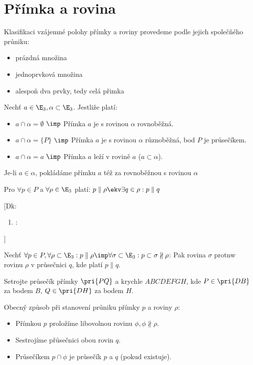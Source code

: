 
\let\braceru=\relax \let\bracelu=\relax 
\def\o#1{\setbox0=
	\hbox{$\kern2pt\overbrace{\kern-2pt#1\kern-2pt}\kern2pt$}\ht0=2.1ex\box0}
\def\to#1{\hbox{#1\rlap{\t{}}}}
\def\rad{\rm{rad}}
\def\f{\frac}
\section{Přímka a rovina}
\Poz Klasifikaci vzájemné polohy přímky a roviny provedeme podle jejich společňého průniku:
\begin{itemize}[a)]
	\item prázdná množina
	\item jednoprvková množina
	\item alespoň dva prvky, tedy celá přimka
\end{itemize}
\Def
Nechť $a\in\E_3,\alpha\subset \E_3$. Jestliže platí:
\begin{itemize}[a)]
	\item $a\cap \alpha = \emptyset$ $\imp$ Přímka $a$ je s rovinou $\alpha$ rovnoběžná.
	\item $a\cap \alpha = \{P\}$ $\imp$ Přímka $a$ je s rovinou $\alpha$ různoběžná, bod $P$ je průsečíkem.
	\item $a\cap \alpha = a$ $\imp$ Přímka $a$ leží v rovině $a$ ($a\subset\alpha$).
\end{itemize}

\Poz Je-li $a\in \alpha$, pokládáme přímku $a$ též za rovnoběžnou s rovinou $\alpha$

Pro $\forall p \in P$ a $\forall \rho \in \E_3$ platí: $p\parallel\rho \ekv \exists q \in \rho: p \parallel q$

[Dk: 
\begin{enumerate}[1.]
	\item \uv{$\imp$}: 
\end{enumerate}
]

\V  Nechť $\forall p \in P, \forall \rho \subset \E_3 : p \parallel \rho \imp \forall \sigma \subset \E_3 : p \subset \sigma \nparallel \rho$: Pak rovina $\sigma$ protnw rovinu $\rho $ v průsečnici $q$, kde platí $p\parallel q$.

\Pr Setrojte průsečík přímky $\pri{PQ}$ a krychle $ABCDEFGH$, kde $P\in\pri{DB}$za bodem $B$, $Q\in \pri{DH}$ za bodem $H$.

\Poz Obecný způsob při stanovení průniku přímky $p$ a roviny $\rho$:
\begin{itemize}
	\item Přímkou $p$ proložíme libovolnou rovinu $\phi,\phi \nparallel \rho$.
	\item Sestrojíme přůsečnici obou rovin $q$.
	\item Průsečíkem $p\cap \phi$ je průsečík $p$ a $q$ (pokud existuje).\\
\end{itemize}


